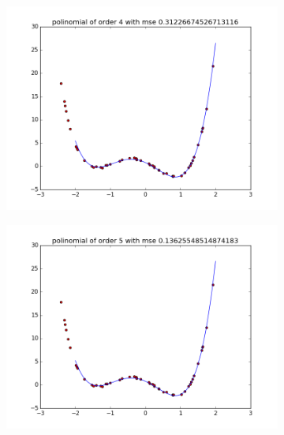 \documentclass{article}
\begin{document}
\begin{figure}
\centering  
        \begin{subfigure}[b]{0.48\textwidth}
                \centering
                \includegraphics[width=\linewidth]{poli-order-4}
        \end{subfigure}\hfill
        \begin{subfigure}[b]{0.48\textwidth}
                \centering
                \includegraphics[width=\linewidth]{poli-order-5}
        \end{subfigure}
        \label{fig:4}
\end{figure}
\end{document}
